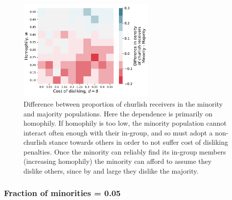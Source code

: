 \documentclass[11pt,letterpaper]{article}
\begin{document}
\begin{figure}[H]
  \centering
    \includegraphics[width=0.6\textwidth]{prelim/Figures/churlish_receivers_diff_025.pdf}
  \caption{Difference between proportion of churlish receivers in the minority 
    and majority populations. Here the dependence is primarily on homophily.
    If homophily is too low, the minority population cannot interact often
    enough with their in-group, and so must adopt a non-churlish stance towards
    others in order to not suffer cost of disliking penalties. Once the minority
    can reliably find its in-group members (increasing homophily) the minority
    can afford to assume they dislike others, since by and large they dislike
    the majority.
  }
  \label{fig:}
\end{figure}


\subsubsection{Fraction of minorities = 0.05}
\end{document}
